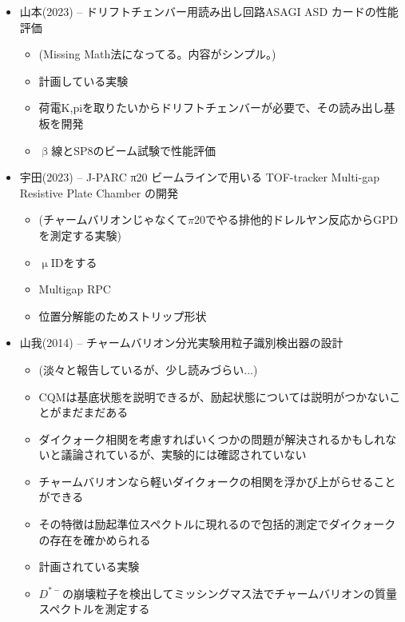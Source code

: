 \documentclass[../main.tex]{subfiles}
\begin{document}
\begin{tcolorbox}[
  title=過去の修論の切り口,
  colback=yellow!8,
  colframe=black!30,
  breakable
]
\begin{itemize}
\begin{itemize}
    \item 実験内容、目標とする統計的有意性や測定精度についても述べている
    \item ビーム運動量$5.0\text{--}8.5\,\,\mathrm{GeV}/c$の$K,\,\,\pi$弁別をしないといけない
    \item Beam-RICHの実機開発
  \end{itemize}
  \item 山本(2023) -- ドリフトチェンバー用読み出し回路ASAGI ASD カードの性能評価
  \begin{itemize}
    \item (Missing Math法になってる。内容がシンプル。)
    \item 計画している実験
    \item 荷電K,piを取りたいからドリフトチェンバーが必要で、その読み出し基板を開発
    \item $\upbeta$線とSP8のビーム試験で性能評価
  \end{itemize}
  \item 宇田(2023) -- J-PARC π20 ビームラインで用いる TOF-tracker Multi-gap Resistive Plate Chamber の開発
  \begin{itemize}
    \item (チャームバリオンじゃなくて$\pi$20でやる排他的ドレルヤン反応からGPDを測定する実験)
    \item $\upmu$IDをする
    \item Multigap RPC
    \item 位置分解能のためストリップ形状
  \end{itemize}
  \item 山我(2014) -- チャームバリオン分光実験用粒子識別検出器の設計
  \begin{itemize}
    \item (淡々と報告しているが、少し読みづらい...)
    \item CQMは基底状態を説明できるが、励起状態については説明がつかないことがまだまだある
    \item ダイクォーク相関を考慮すればいくつかの問題が解決されるかもしれないと議論されているが、実験的には確認されていない
    \item チャームバリオンなら軽いダイクォークの相関を浮かび上がらせることができる
    \item その特徴は励起準位スペクトルに現れるので包括的測定でダイクォークの存在を確かめられる
    \item 計画されている実験
    \item $D^{\ast -}$の崩壊粒子を検出してミッシングマス法でチャームバリオンの質量スペクトルを測定する

\end{itemize}
\end{itemize}
\end{tcolorbox}
\end{document}
